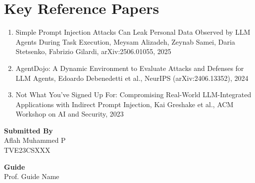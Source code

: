 \documentclass[12pt]{article}
\newcommand{\studentname}{Aflah Muhammed P}
\newcommand{\rollno}{TVE23CSXXX}
\newcommand{\guidename}{Prof. Guide Name}
\begin{document}
\section*{Key Reference Papers}
\begin{enumerate}
  \item Simple Prompt Injection Attacks Can Leak Personal Data Observed by LLM Agents During Task Execution, Meysam Alizadeh, Zeynab Samei, Daria Stetsenko, Fabrizio Gilardi, arXiv:2506.01055, 2025
  \item AgentDojo: A Dynamic Environment to Evaluate Attacks and Defenses for LLM Agents, Edoardo Debenedetti et al., NeurIPS (arXiv:2406.13352), 2024
  \item Not What You've Signed Up For: Compromising Real-World LLM-Integrated Applications with Indirect Prompt Injection, Kai Greshake et al., ACM Workshop on AI and Security, 2023
\end{enumerate}
\vspace{1.5em}

\noindent\textbf{Submitted By}\\
\studentname\\
\rollno

\vspace{1em}
\noindent\textbf{Guide}\\
\guidename
\end{document}
